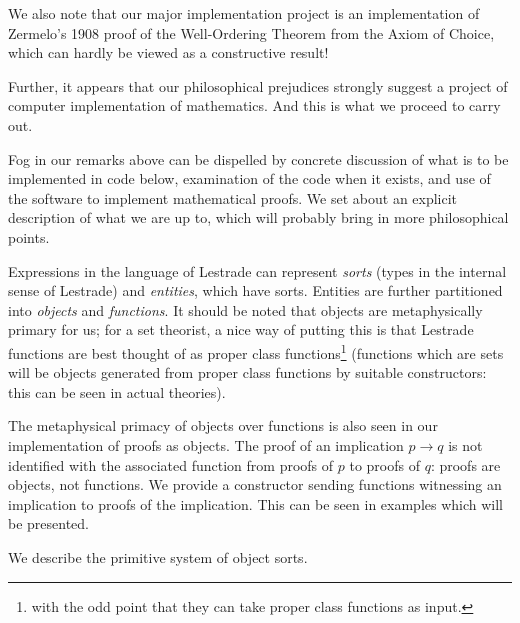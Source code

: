 \documentclass[12pt]{article}
\begin{document}
We also note that our major implementation project is an implementation of Zermelo's 1908 proof of the Well-Ordering Theorem from the Axiom of Choice, which can hardly be viewed as a constructive result!

Further, it appears that our philosophical prejudices strongly suggest a project of computer implementation of mathematics.  And this is what we proceed to carry out.

Fog in our remarks above can be dispelled by concrete discussion of what is to be implemented in code below, examination of the code when it exists, and use of the software to implement
mathematical proofs.  We set about an explicit description of what we are up to, which will probably bring in more philosophical points.

Expressions in the language of Lestrade can represent {\em sorts} (types in the internal sense of Lestrade) and {\em entities\/}, which have sorts.  Entities are further partitioned
into {\em objects\/} and {\em functions\/}.  It should be noted that objects are metaphysically primary for us;  for a set theorist, a nice way of putting this is that Lestrade functions
are best thought of as proper class functions\footnote{with the odd point that they can take proper class functions as input.}  (functions which are sets will be objects generated from proper class functions by suitable constructors:  this can be seen in actual theories).

The metaphysical primacy of objects over functions is also seen in our implementation of proofs as objects.  The proof of an implication $p \rightarrow q$ is not identified with
the associated function from proofs of $p$ to proofs of $q$:  proofs are objects, not functions.  We provide a constructor sending functions witnessing an implication to proofs of the implication.  This can be seen in examples which will be presented.

We describe the primitive system of object sorts. 
\end{document}

